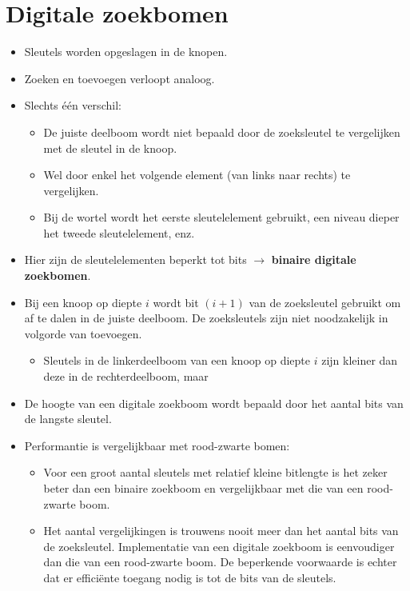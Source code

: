\section{Digitale zoekbomen}
\begin{itemize}
    \item Sleutels worden opgeslagen in de knopen.
    \item Zoeken en toevoegen verloopt analoog.
    \item Slechts één verschil:
    \begin{itemize}
        \item De juiste deelboom wordt niet bepaald door de zoeksleutel te vergelijken met de sleutel in de knoop.
        \item Wel door enkel het volgende element (van links naar rechts) te vergelijken.
        \item Bij de wortel wordt het eerste sleutelelement gebruikt, een niveau dieper het tweede sleutelelement, enz.
    \end{itemize}
    \item Hier zijn de sleutelelementen beperkt tot bits $\rightarrow$ \textbf{binaire digitale zoekbomen}.
    \item Bij een knoop op diepte $i$ wordt bit $(i + 1)$ van de zoeksleutel gebruikt om af te dalen in de juiste deelboom.
    \alert De zoeksleutels zijn niet noodzakelijk in volgorde van toevoegen.
    \begin{itemize}
        \item Sleutels in de linkerdeelboom van een knoop op diepte $i$ zijn kleiner dan deze in de rechterdeelboom, maar 
    \end{itemize}
    \item De hoogte van een digitale zoekboom wordt bepaald door het aantal bits van de langste sleutel.
    \item Performantie is vergelijkbaar met rood-zwarte bomen:
    \begin{itemize}
        \item Voor een groot aantal sleutels met relatief kleine bitlengte is het zeker beter dan een binaire zoekboom en vergelijkbaar met die van een rood-zwarte boom.
        \item Het aantal vergelijkingen is trouwens nooit meer dan het aantal bits van de zoeksleutel.
        \good Implementatie van een digitale zoekboom is eenvoudiger dan die van een rood-zwarte boom.
        \alert De beperkende voorwaarde is echter dat er efficiënte toegang nodig is tot de bits van de sleutels.
    \end{itemize}
\end{itemize}